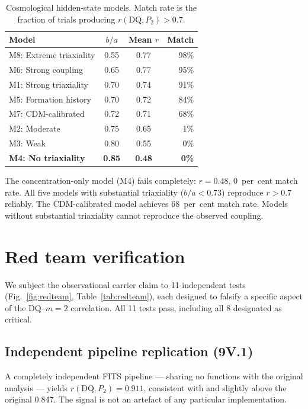 \documentclass[fleqn,usenatbib]{mnras}
\newcommand{\DQ}{\mathrm{DQ}}
\newcommand{\mtwo}{m{=}2}
\begin{document}
\begin{table}
\centering
\caption{Cosmological hidden-state models. Match rate is the fraction of trials producing $r(\DQ, P_2) > 0.7$.}
\label{tab:cosmo}
\begin{tabular}{lccr}
\toprule
Model & $b/a$ & Mean $r$ & Match \\
\midrule
M8: Extreme triaxiality & 0.55 & 0.77 & 98\% \\
M6: Strong coupling & 0.65 & 0.77 & 95\% \\
M1: Strong triaxiality & 0.70 & 0.74 & 91\% \\
M5: Formation history & 0.70 & 0.72 & 84\% \\
M7: CDM-calibrated & 0.72 & 0.71 & 68\% \\
M2: Moderate & 0.75 & 0.65 & 1\% \\
M3: Weak & 0.80 & 0.55 & 0\% \\
\textbf{M4: No triaxiality} & \textbf{0.85} & \textbf{0.48} & \textbf{0\%} \\
\bottomrule
\end{tabular}
\end{table}

The concentration-only model (M4) fails completely: $r = 0.48$, 0~per~cent match rate.
All five models with substantial triaxiality ($b/a < 0.73$) reproduce $r > 0.7$ reliably.
The CDM-calibrated model \citep[Allgood et al. parameters;][]{Allgood2006} achieves 68~per~cent match rate.
Models without substantial triaxiality cannot reproduce the observed coupling.


\section{Red team verification}
\label{sec:redteam}

We subject the observational carrier claim to 11 independent tests (Fig.~\ref{fig:redteam}, Table~\ref{tab:redteam}), each designed to falsify a specific aspect of the $\DQ$--$\mtwo$ correlation.
All 11 tests pass, including all 8 designated as critical.

\subsection{Independent pipeline replication (9V.1)}

A completely independent FITS pipeline --- sharing no functions with the original analysis --- yields $r(\DQ, P_2) = 0.911$, consistent with and slightly above the original 0.847.
The signal is not an artefact of any particular implementation.
\end{document}
